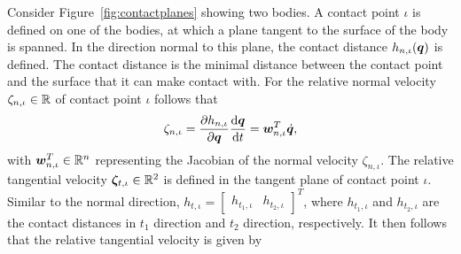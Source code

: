 \documentclass[../DC2017114Bouma.tex]{subfiles}
\begin{document}
Consider Figure~\ref{fig:contactplanes} showing two bodies. A contact point $\iota$ is defined on one of the bodies, at which a plane tangent to the surface of the body is spanned. In the direction normal to this plane, the contact distance $h_{n,\iota}({\boldsymbol{q}})$ is defined. The contact distance is the minimal distance between the contact point and the surface that it can make contact with. For the relative normal velocity $\zeta_{n,\iota}\in\mathbb{R}$ of contact point $\iota$ follows that
\begin{align}
\zeta_{n,\iota} = \frac{\partial h_{n,\iota}}{\partial{\boldsymbol{q}}}\frac{\text{d}{\boldsymbol{q}}}{\text{d} t} = {\boldsymbol{w}}_{n,\iota}^T\dot{{\boldsymbol{q}}},
\end{align}
%
%
%
%
%
%
%
%
%
%
%
%
%
%
%
%
%
%
%
%
with ${\boldsymbol{w}}^T_{n,\iota}\in\mathbb{R}^n$ representing the Jacobian of the normal velocity $\zeta_{n,\iota}$. The relative tangential velocity $\boldsymbol{\zeta}_{t,\iota}\in\mathbb{R}^2$ is defined in the tangent plane of contact point $\iota$. Similar to the normal direction, $h_{t,\iota} = \begin{bmatrix} h_{t_1,\iota} & h_{t_2,\iota} \end{bmatrix}^T$, where $h_{t_1,\iota}$ and $h_{t_2,\iota}$ are the contact distances in $t_1$ direction and $t_2$ direction, respectively. It then follows that the relative tangential  velocity is given by
\end{document}

